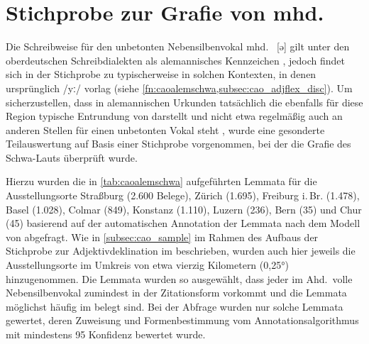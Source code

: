 \section{Stichprobe zur Grafie von mhd.\ }
\label{sec:caoalemschwa}

Die Schreibweise  für den unbetonten Nebensilbenvokal mhd.~ [ə]
gilt unter den ober\-deutschen Schreibdialekten als alemannisches Kennzeichen
\autocites[vgl.][25]{weinhold1863}[75]{weinhold1883}[41, 113]{paul2007}, jedoch
findet sich  in der Stichprobe zu  
typischerweise in solchen Kontexten, in denen ursprünglich  /yː/
vorlag (siehe \cref{fn:caoalemschwa,subsec:cao_adjflex_disc}). Um
sicherzustellen, dass  in alemannischen Urkunden tatsächlich die
ebenfalls für diese Region typische Entrundung von  darstellt und
nicht etwa regelmäßig auch an anderen Stellen für einen unbetonten Vokal steht
\autocites%
	[466--467]{schirmunski1962}%
	[41]{paul2007}%
	[305]{ksw2}%
	[vgl.~auch][131--132]{boesch1946}%
, wurde eine gesonderte Teilauswertung auf Basis einer Stichprobe vorgenommen,
bei der die Grafie des Schwa-Lauts überprüft wurde.

Hierzu wurden die in \cref{tab:caoalemschwa} aufgeführten Lemmata für die
Ausstellungsorte
Straßburg (2.600 Belege),
% 
Zürich (1.695),
% 
Freiburg i.\,Br. (1.478),
% 
Basel (1.028),
% 
Colmar (849),
% 
Konstanz (1.110),
% 
Luzern (236),
% 
Bern (35)
% 
und Chur (45)
% 
basierend auf der automatischen Annotation der Lemmata nach dem Modell von
\citet{schmid2019} abgefragt. Wie in \cref{subsec:cao_sample} im Rahmen des
Aufbaus der Stichprobe zur Adjektivdeklination im  beschrieben,
wurden auch hier jeweils die Ausstellungsorte im Umkreis von etwa vierzig
Kilometern (0,25°) hinzugenommen. Die Lemmata wurden so ausgewählt, dass jeder
im Ahd.\ volle Nebensilbenvokal zumindest in der Zitationsform vorkommt und die
Lemmata möglichst häufig im  belegt sind. Bei der Abfrage wurden
nur solche Lemmata gewertet, deren Zuweisung und Formenbestimmung vom
Annotations\-algorithmus mit mindestens 95\pct{} Konfidenz bewertet wurde.

